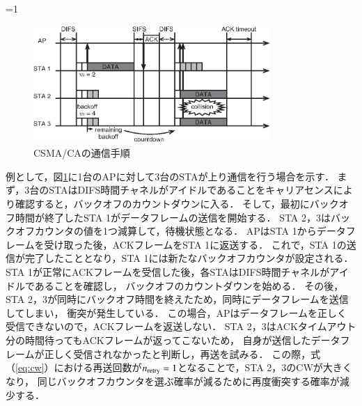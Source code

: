 \documentclass[master]{kuisthesis}		%
\newcounter{flagFig}
\begin{document}
			\par
			\ifnum\value{flagFig}=1{
			\begin{figure}[t]
				\begin{center}
					\includegraphics[width=0.8\textwidth]{fig/csmaca.eps}
					\caption{CSMA/CAの通信手順}
					\label{fig:csmaca}
				\end{center}
			\end{figure}}\fi
			例として，図\ref{fig:csmaca}に1台のAPに対して3台のSTAが上り通信を行う場合を示す．
			まず，3台のSTAはDIFS時間チャネルがアイドルであることをキャリアセンスにより確認すると，バックオフのカウントダウンに入る．
			そして，最初にバックオフ時間が終了したSTA 1がデータフレームの送信を開始する．
			STA 2，3はバックオフカウンタの値を1つ減算して，待機状態となる．
			APはSTA 1からデータフレームを受け取った後，ACKフレームをSTA 1に返送する．
			これで，STA 1の送信が完了したこととなり，STA 1には新たなバックオフカウンタが設定される．
			STA 1が正常にACKフレームを受信した後，各STAはDIFS時間チャネルがアイドルであることを確認し，
			バックオフのカウントダウンを始める．
			その後，STA 2，3が同時にバックオフ時間を終えたため，同時にデータフレームを送信してしまい，
			衝突が発生している．
			この場合，APはデータフレームを正しく受信できないので，ACKフレームを返送しない．
			STA 2，3はACKタイムアウト分の時間待ってもACKフレームが返ってこないため，
			自身が送信したデータフレームが正しく受信されなかったと判断し，再送を試みる．
			この際，式（\ref{eq:cw}）における再送回数が$n_{\rm retry}=1$となることで，STA 2，3のCWが大きくなり，
			同じバックオフカウンタを選ぶ確率が減るために再度衝突する確率が減少する．
\end{document}
